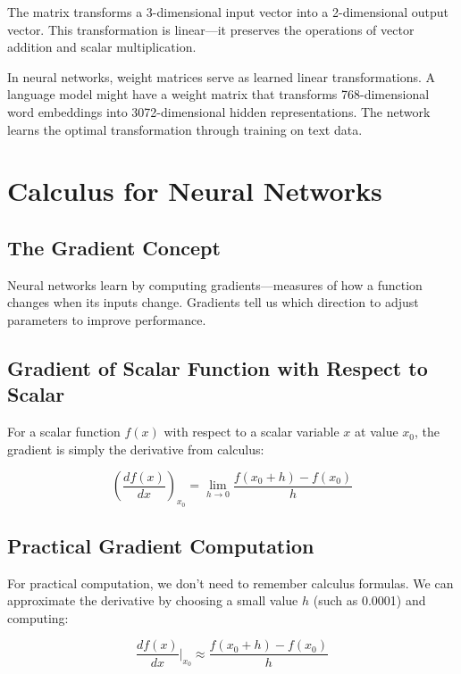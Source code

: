 \documentclass{book}
\begin{document}
The matrix transforms a 3-dimensional input vector into a 2-dimensional output vector. This transformation is linear—it preserves the operations of vector addition and scalar multiplication.

In neural networks, weight matrices serve as learned linear transformations. A language model might have a weight matrix that transforms 768-dimensional word embeddings into 3072-dimensional hidden representations. The network learns the optimal transformation through training on text data.

\section{Calculus for Neural Networks}

\subsection{The Gradient Concept}

Neural networks learn by computing gradients—measures of how a function changes when its inputs change. Gradients tell us which direction to adjust parameters to improve performance.

\subsection{Gradient of Scalar Function with Respect to Scalar}

For a scalar function $f(x)$ with respect to a scalar variable $x$ at value $x_0$, the gradient is simply the derivative from calculus:

\begin{equation}
\left(\frac{df(x)}{dx}\right)_{x_0} = \lim_{h \to 0} \frac{f(x_0 + h) - f(x_0)}{h}
\end{equation}

\subsection{Practical Gradient Computation}

For practical computation, we don't need to remember calculus formulas. We can approximate the derivative by choosing a small value $h$ (such as 0.0001) and computing:

\begin{equation}
\frac{df(x)}{dx} \bigg|_{x_0} \approx \frac{f(x_0 + h) - f(x_0)}{h}
\end{equation}
\end{document}
